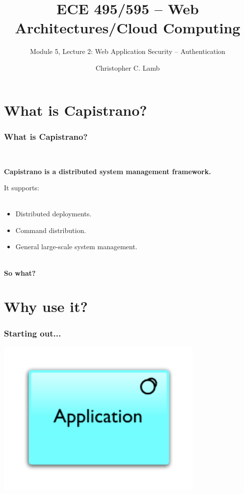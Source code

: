 \documentclass[t,handout]{beamer}
\title[Module 5, Lecture 2]{ECE 495/595 -- Web Architectures/Cloud Computing}
\subtitle{Module 5, Lecture 2: Web Application Security -- Authentication}
\author[\copyright \ 2012 C. C. Lamb]{Christopher C. Lamb}
\date{}
\institute[University of New Mexico]{\large University of New Mexico}
\begin{document}
\begin{frame}
\titlepage
\end{frame}



\section{What is Capistrano?}
\begin{frame}
\frametitle{What is Capistrano?}
~\\
\begin{center}
{\bf Capistrano is a distributed system management framework.} \\
\end{center}
It supports: \\
~\\
\begin{small}
\begin{itemize}
\item Distributed deployments.
\item Command distribution.
\item General large-scale system management.
\end{itemize}
\end{small}
\begin{center}
~\\
{\bf So what?}
\end{center}
\end{frame}

\section{Why use it?}
\begin{frame}
\frametitle{Starting out...}
\includegraphics[width = 4in]{cap-app.pdf}
\transfade
\end{frame}
\end{document}
